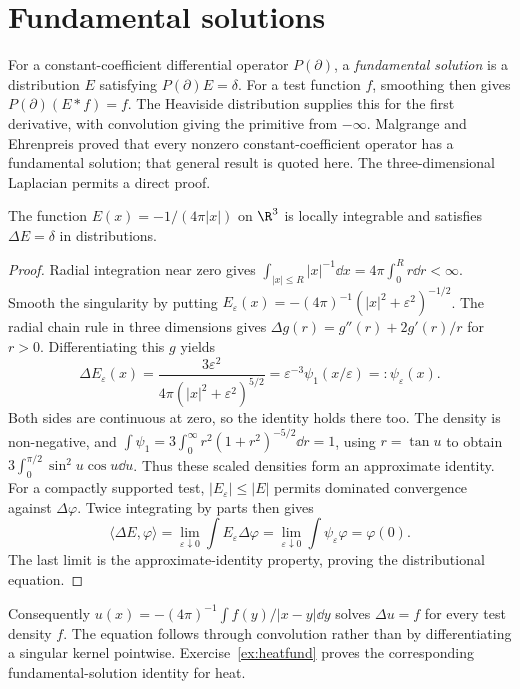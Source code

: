 \section{Fundamental solutions}

For a constant-coefficient differential operator $P(\partial)$, a \emph{fundamental solution} is a distribution $E$ satisfying $P(\partial)E=\delta$. For a test function $f$, smoothing then gives $P(\partial)(E*f)=f$. The Heaviside distribution supplies this for the first derivative, with convolution giving the primitive from $-\infty$. Malgrange and Ehrenpreis proved that every nonzero constant-coefficient operator has a fundamental solution; that general result is quoted here. The three-dimensional Laplacian permits a direct proof.

\begin{theorem}\label{thm:newton}
The function $E(x)=-1/(4\pi|x|)$ on $\R^3$ is locally integrable and satisfies $\Delta E=\delta$ in distributions.
\end{theorem}
\begin{proof}
Radial integration near zero gives $\int_{|x|\le R}|x|^{-1}\dd x=4\pi\int_0^Rr\dd r<\infty$. Smooth the singularity by putting $E_\varepsilon(x)=-(4\pi)^{-1}(|x|^2+\varepsilon^2)^{-1/2}$. The radial chain rule in three dimensions gives $\Delta g(r)=g''(r)+2g'(r)/r$ for $r>0$. Differentiating this $g$ yields
\[
\Delta E_\varepsilon(x)=\frac{3\varepsilon^2}{4\pi(|x|^2+\varepsilon^2)^{5/2}}
=\varepsilon^{-3}\psi_1(x/\varepsilon)=:\psi_\varepsilon(x).
\]
Both sides are continuous at zero, so the identity holds there too. The density is non-negative, and
$\int\psi_1=3\int_0^\infty r^2(1+r^2)^{-5/2}\dd r=1$,
using $r=\tan u$ to obtain $3\int_0^{\pi/2}\sin^2u\cos u\dd u$. Thus these scaled densities form an approximate identity.
For a compactly supported test, $|E_\varepsilon|\le|E|$ permits dominated convergence against $\Delta\varphi$. Twice integrating by parts then gives
\[
\langle\Delta E,\varphi\rangle
=\lim_{\varepsilon\downarrow0}\int E_\varepsilon\Delta\varphi
=\lim_{\varepsilon\downarrow0}\int\psi_\varepsilon\varphi
=\varphi(0).
\]
The last limit is the approximate-identity property, proving the distributional equation.
\end{proof}

Consequently $u(x)=-(4\pi)^{-1}\int f(y)/|x-y|\dd y$ solves $\Delta u=f$ for every test density $f$. The equation follows through convolution rather than by differentiating a singular kernel pointwise. Exercise~\ref{ex:heatfund} proves the corresponding fundamental-solution identity for heat.

